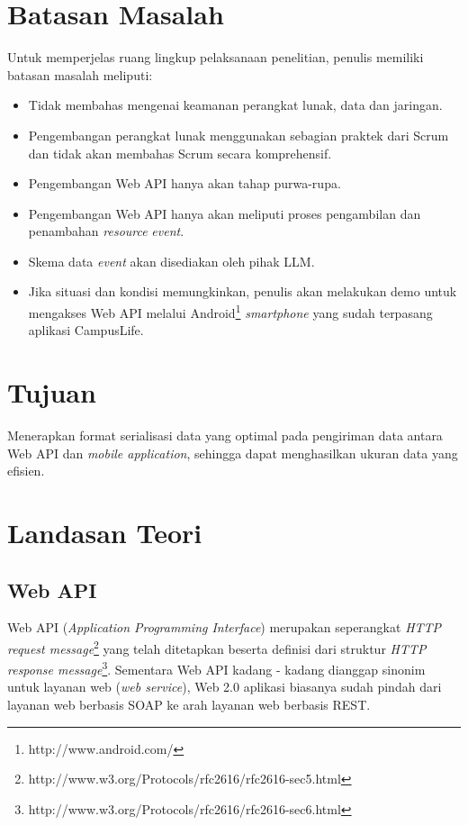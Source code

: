 \documentclass[a4paper, 12pt]{report}
\begin{document}
\section*{Batasan Masalah}
\onehalfspacing Untuk memperjelas ruang lingkup pelaksanaan penelitian, penulis memiliki batasan masalah meliputi:
\onehalfspacing
\begin{itemize}
  \item Tidak membahas mengenai keamanan perangkat lunak, data dan jaringan.
  \item Pengembangan perangkat lunak menggunakan sebagian praktek dari Scrum dan tidak akan membahas Scrum secara komprehensif.
  \item Pengembangan Web API hanya akan tahap purwa-rupa.
  \item Pengembangan Web API hanya akan meliputi proses pengambilan dan penambahan \textit{resource} \textit{event}.
  \item Skema data \textit{event} akan disediakan oleh pihak LLM.
  \item Jika situasi dan kondisi memungkinkan, penulis akan melakukan demo untuk mengakses Web API melalui Android\footnote{http://www.android.com/} \textit{smartphone}  yang sudah terpasang aplikasi CampusLife.
\end{itemize}

\section*{Tujuan}
\onehalfspacing 
Menerapkan format serialisasi data yang optimal pada pengiriman data antara Web API dan \textit{mobile application}, sehingga dapat menghasilkan ukuran data yang efisien.

\section*{Landasan Teori}
\subsection*{Web API}
\onehalfspacing Web API (\textit{Application Programming Interface}) merupakan seperangkat \textit{HTTP request message}\footnote{http://www.w3.org/Protocols/rfc2616/rfc2616-sec5.html} yang telah ditetapkan beserta definisi dari struktur \textit{HTTP response message}\footnote{http://www.w3.org/Protocols/rfc2616/rfc2616-sec6.html}. Sementara Web API kadang - kadang dianggap sinonim untuk layanan web (\textit{web service}), Web 2.0 aplikasi biasanya sudah pindah dari layanan web berbasis SOAP ke arah layanan web berbasis REST\cite{web-api}\cite{rest-soap}.
\end{document}
